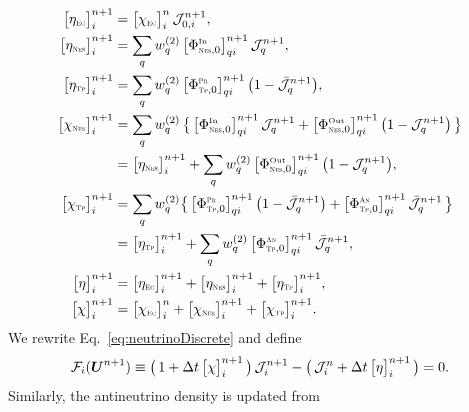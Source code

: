 \documentclass[12pt]{article}
\newcommand{\EC}{\mbox{\tiny{\sc Ec}}}
\newcommand{\NES}{\mbox{\tiny{\sc Nes}}} %
\newcommand{\PROD}{\mbox{\tiny{\sc Pr}}}
\newcommand{\ANN}{\mbox{\tiny{\sc An}}}
\newcommand{\TP}{\mbox{\tiny{\sc Tp}}}      %
\begin{document}
\begin{align}
  \big[\eta_{\EC}\big]_{i}^{n+1}
  &=\big[\chi_{\EC}\big]_{i}^{n}\,\mathcal{J}_{0,i}^{n+1}, \label{eq:ECemissivityNeutrino} \\
  \big[\eta_{\NES}\big]_{i}^{n+1}
  &=\sum_{q}w_{q}^{(2)}\,\big[\Phi_{\NES,0}^{\In}\big]_{qi}^{n+1}\,\mathcal{J}_{q}^{n+1}, \label{eq:NESemissivityNeutrino} \\
  \big[\eta_{\TP}\big]_{i}^{n+1}
  &=\sum_{q}w_{q}^{(2)}\,\big[\Phi_{\TP,0}^{\PROD}\big]_{qi}^{n+1}\,\big(1-\bar{\mathcal{J}}_{q}^{n+1}\big), \label{eq:PAIRemissivityNeutrino} \\
  \big[\chi_{\NES}\big]_{i}^{n+1}
  &=\sum_{q}w_{q}^{(2)}\,\big\{\,\big[\Phi_{\NES,0}^{\In}\big]_{qi}^{n+1}\,\mathcal{J}_{q}^{n+1}+\big[\Phi_{\NES,0}^{\Out}\big]_{qi}^{n+1}\,\big(1-\mathcal{J}_{q}^{n+1}\big)\,\big\} \\
  &=\big[\eta_{\NES}\big]_{i}^{n+1}+\sum_{q}w_{q}^{(2)}\,\big[\Phi_{\NES,0}^{\Out}\big]_{qi}^{n+1}\,\big(1-\mathcal{J}_{q}^{n+1}\big), \label{eq:NESopacityNeutrino} \\
  \big[\chi_{\TP}\big]_{i}^{n+1}
  &=\sum_{q}w_{q}^{(2)}\big\{\,\big[\Phi_{\TP,0}^{\PROD}\big]_{qi}^{n+1}\,\big(1-\bar{\mathcal{J}}_{q}^{n+1}\big)+\big[\Phi_{\TP,0}^{\ANN}\big]_{qi}^{n+1}\,\bar{\mathcal{J}}_{q}^{n+1}\,\big\} \\
  &=\big[\eta_{\TP}\big]_{i}^{n+1}+\sum_{q}w_{q}^{(2)}\,\big[\Phi_{\TP,0}^{\ANN}\big]_{qi}^{n+1}\,\bar{\mathcal{J}}_{q}^{n+1}, \label{eq:PAIRopacityNeutrino} \\
  \big[\eta\big]_{i}^{n+1}
  &=\big[\eta_{\EC}\big]_{i}^{n+1}+\big[\eta_{\NES}\big]_{i}^{n+1}+\big[\eta_{\TP}\big]_{i}^{n+1}, \label{eq:TOTALemissivityNeutrino} \\
  \big[\chi\big]_{i}^{n+1}
  &=\big[\chi_{\EC}\big]_{i}^{n}+\big[\chi_{\NES}\big]_{i}^{n+1}+\big[\chi_{\TP}\big]_{i}^{n+1}.  \label{eq:TOTALopacityNeutrino}
\end{align}
We rewrite Eq.~\eqref{eq:neutrinoDiscrete} and define
\begin{equation}
  \mathcal{F}_{i}(\boldsymbol{U}^{n+1})
  \equiv\big(\,1+\Delta t\,\big[\chi\big]_{i}^{n+1}\,\big)\,\mathcal{J}_{i}^{n+1}-\big(\,\mathcal{J}_{i}^{n}+\Delta t\,\big[\eta\big]_{i}^{n+1}\,\big)=0.
  \label{eq:neutrinoDiscreteResidualForm}
\end{equation}
Similarly, the antineutrino density is updated from
\end{document}
